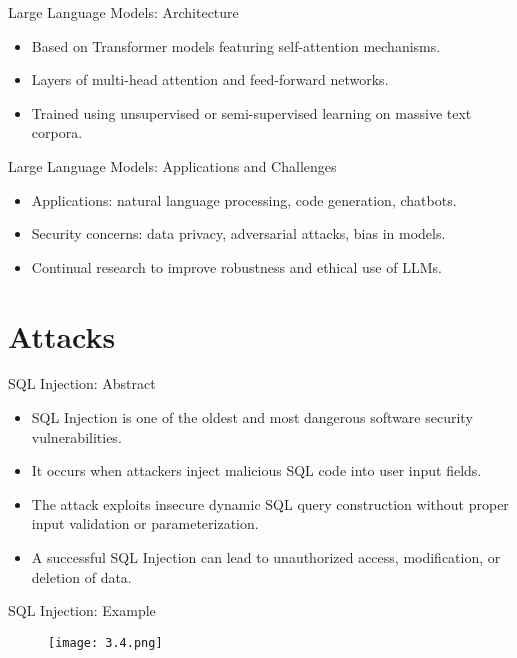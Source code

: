 \documentclass[t,ignorenonframetext]{beamer}
\begin{document}
\begin{frame}{Large Language Models: Architecture}
\begin{itemize}
\item Based on Transformer models featuring self-attention mechanisms.
\item Layers of multi-head attention and feed-forward networks.
\item Trained using unsupervised or semi-supervised learning on massive text corpora.
\end{itemize}
\end{frame}

\begin{frame}{Large Language Models: Applications and Challenges}
\begin{itemize}
\item Applications: natural language processing, code generation, chatbots.
\item Security concerns: data privacy, adversarial attacks, bias in models.
\item Continual research to improve robustness and ethical use of LLMs.
\end{itemize}
\end{frame}

\section{Attacks}
\begin{frame}{SQL Injection: Abstract}
\begin{itemize}
    \item SQL Injection is one of the oldest and most dangerous software security vulnerabilities.
    \item It occurs when attackers inject malicious SQL code into user input fields.
    \item The attack exploits insecure dynamic SQL query construction without proper input validation or parameterization.
    \item A successful SQL Injection can lead to unauthorized access, modification, or deletion of data.
\end{itemize}
\end{frame}

\begin{frame}{SQL Injection: Example}
\begin{figure}[htb]
	\centering
	\texttt{[image: 3.4.png]}
\end{figure}

\end{frame}
\end{document}
